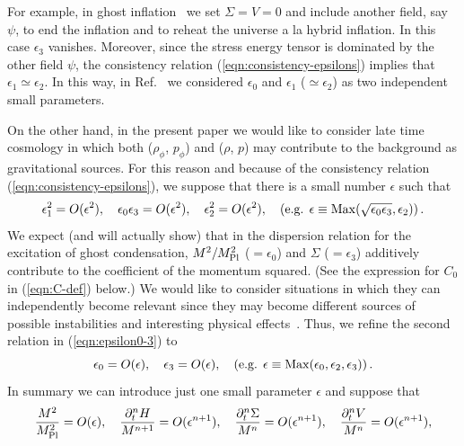For example, in ghost inflation~\cite{Arkani-Hamed:2003uz} we set
$\Sigma=V=0$ and include another field, say $\psi$, to end the inflation
and to reheat the universe a la hybrid inflation. In this case
$\epsilon_3$ vanishes. Moreover, since the stress energy tensor is
dominated by the other field $\psi$, the consistency relation
(\ref{eqn:consistency-epsilons}) implies that 
$\epsilon_1\simeq\epsilon_2$. In this way, in
Ref.~\cite{Arkani-Hamed:2003uz} we considered $\epsilon_0$ and 
$\epsilon_1$ ($\simeq\epsilon_2$) as two independent small parameters. 


On the other hand, in the present paper we would like to consider
late time cosmology in which both ($\rho_{\phi}$, $p_{\phi}$) and 
($\rho$, $p$) may contribute to the background as gravitational
sources. For this reason and because of the consistency relation
(\ref{eqn:consistency-epsilons}), we suppose that there is a small
number $\epsilon$ such that 
%
\begin{equation}
 \epsilon_1^2 = O(\epsilon^2), \quad 
  \epsilon_0\epsilon_3 = O(\epsilon^2), \quad
  \epsilon_2^2 = O(\epsilon^2), 
  \quad
  \left( \mbox{e.g. }
   \epsilon \equiv {\rm Max}(\sqrt{\epsilon_0\epsilon_3},\epsilon_2)
  \right).
  \label{eqn:epsilon0-3}
\end{equation}
We expect (and will actually show) that in the dispersion relation for
the excitation of ghost condensation, $M^2/M_{\rm Pl}^2$ ($=\epsilon_0$) 
and $\Sigma$ ($=\epsilon_3$) additively contribute to the coefficient of
the momentum squared. (See the expression for $C_0$ in (\ref{eqn:C-def})
below.) We would like to consider situations in which they can
independently become relevant since they may become different sources of
possible instabilities and interesting physical
effects~\cite{Creminelli:2006xe}. Thus, we refine the second relation in
(\ref{eqn:epsilon0-3}) to 
%
\begin{equation}
 \epsilon_0 = O(\epsilon), \quad \epsilon_3=O(\epsilon),\quad
  \left( \mbox{e.g. }
   \epsilon \equiv {\rm Max}
   (\epsilon_0,\epsilon_2,\epsilon_3)
       \right).
\end{equation}
In summary we can introduce just one small parameter $\epsilon$ and
suppose that 
%
\begin{equation}
 \frac{M^2}{M_{\rm Pl}^2} = O(\epsilon), \quad
 \frac{\partial_t^nH}{M^{n+1}} = O(\epsilon^{n+1}), \quad
 \frac{\partial_t^n\Sigma}{M^n} = O(\epsilon^{n+1}), \quad
 \frac{\partial_t^n V}{M^n} = O(\epsilon^{n+1}), 
 \label{eqn:lowE-background}
\end{equation}
